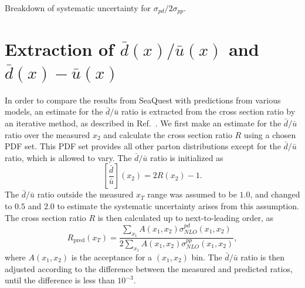 \documentclass[reprint,aps,unsortedaddress,superscriptaddress,prc,floatfix,showpacs,linenumbers]{revtex4-2}
\begin{document}
\begin{table}
	\centering
	\caption{Breakdown of systematic uncertainty for $\sigma_{pd}/2\sigma_{pp}$.}
	\begin{adjustbox}{max width=\linewidth}
		
	\end{adjustbox}
\end{table}

\section{Extraction of \texorpdfstring{$\bar{d}\left(x\right)/\bar{u}\left(x\right)$}{dbar(x)/ubar(x)}
  and \texorpdfstring{$\bar{d}\left(x\right)-\bar{u}\left(x\right)$}{dbar(x)-ubar(x)}}
\label{sec:extraction}
In order to compare the results from SeaQuest with predictions from various models,
an estimate for the $\bar{d}/\bar{u}$ ratio is extracted from the cross section ratio by
an iterative method, as described in Ref.~\cite{dove2021}.
We first make an estimate for the $\bar{d}/\bar{u}$ ratio over the measured $x_2$
and calculate the cross section ratio $R$ using a chosen PDF set.
This PDF set provides all other parton distributions except for the $\bar{d}/\bar{u}$ ratio,
which is allowed to vary. The $\bar{d}/\bar{u}$ ratio is initialized as
\begin{equation}
	\left[\frac{\bar{d}}{\bar{u}}\right]\left(x_2\right) = 2R\left(x_2\right)-1.
\end{equation}
The $\bar{d}/\bar{u}$ ratio outside the measured $x_T$ range was assumed to be $1.0$,
and changed to $0.5$ and $2.0$ to estimate the systematic uncertainty arises from this assumption.
The cross section ratio $R$ is then calculated up to next-to-leading order, as
\begin{equation}
	R_{\mathrm{pred}}\left(x_T\right)  = \frac{\sum_{x_1} A\left(x_1, x_2\right)\sigma^{pd}_{NLO}\left(x_1, x_2\right)}{2\sum_{x_1} A\left(x_1, x_2\right)\sigma^{pp}_{NLO}\left(x_1, x_2\right)},
\end{equation}
where $A\left(x_1,x_2\right)$ is the acceptance for a $\left(x_1, x_2\right)$ bin.
The $\bar{d}/\bar{u}$ ratio is then adjusted according to the difference between
the measured and predicted ratios, until the difference is less than $10^{-3}$.
\end{document}
